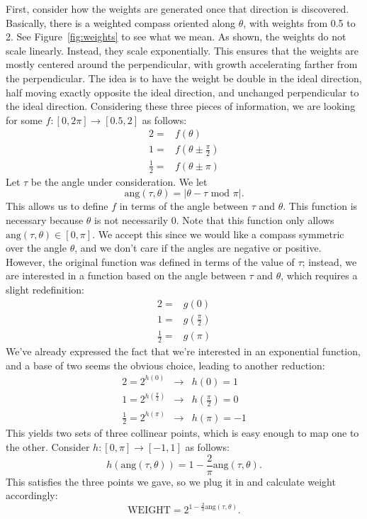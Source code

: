 \documentclass[twocolumn,12pt]{article}
\begin{document}
First, consider how the weights are generated once
that direction is discovered. Basically, there is a weighted compass oriented
along $\theta$, with weights from 0.5 to 2. See Figure~\ref{fig:weights} to
see what we mean. As shown, the weights do not scale linearly. Instead, they
scale exponentially. This ensures that the weights are mostly centered around
the perpendicular, with growth accelerating farther from the perpendicular.
The idea is to have the weight be double in the ideal
direction, half moving exactly opposite the ideal direction, and unchanged
perpendicular to the ideal direction. Considering these three pieces of
information, we are looking for some $f : [0,2\pi] \to [0.5,2]$ as follows:
\begin{align*}
  2 = & f(\theta) \\
  1 = & f(\theta \pm \frac{\pi}{2}) \\
  \frac{1}{2} = & f(\theta \pm \pi)
\end{align*}
Let $\tau$ be the angle under consideration. We let
\[ \mbox{ang}(\tau, \theta) = |\theta - \tau \mbox{ mod } \pi|. \]
This allows us to define $f$ in terms of the angle between $\tau$ and
$\theta$. This function is necessary because $\theta$ is not necessarily
0. Note that this function only allows $\mbox{ang}(\tau, \theta)
\in [0,\pi]$. We accept this since we would like a compass symmetric
over the angle $\theta$, and we don't care if the angles are negative
or positive. However, the original function was defined in terms of the
value of $\tau$; instead, we are interested in a function based on the
angle between $\tau$ and $\theta$, which requires a slight redefinition:
\begin{align*}
  2 = & g(0) \\
  1 = & g(\frac{\pi}{2}) \\
  \frac{1}{2} = & g(\pi)
\end{align*}
We've already expressed the fact that we're interested in an exponential
function, and a base of two seems the obvious choice, leading to another
reduction:
\begin{align*}
  2 = 2^{h(0)} & \to & h(0) = 1 \\
  1 = 2^{h(\frac{\pi}{2})} & \to & h(\frac{\pi}{2}) = 0\\
  \frac{1}{2} = 2^{h(\pi)} & \to & h(\pi) = -1
\end{align*}
This yields two sets of three collinear points, which is easy enough to
map one to the other. Consider $h : [0,\pi] \to [-1,1]$ as follows:
\[ h(\mbox{ang}(\tau,\theta)) = 1 - \frac{2}{\pi}\mbox{ang}(\tau, \theta). \]
This satisfies the three points we gave, so we plug it in and calculate weight
accordingly:
\begin{equation}
  \mbox{WEIGHT} = 2^{1-\frac{2}{\pi}\mbox{ang}(\tau,\theta)}. \label{eq:weight}
\end{equation}
\end{document}
